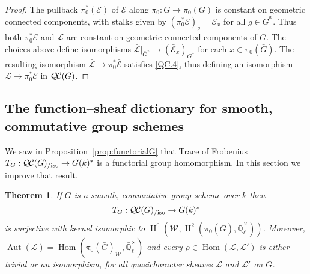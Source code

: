 \documentclass{amsart}
\theoremstyle{plain}
\newtheorem{theorem}{Theorem}[section]
\theoremstyle{definition}
\theoremstyle{remark}
\newcommand{\EE}{\mathbb{\bar Q}_\ell}
\newcommand{\Fq}{k}
\newcommand{\EEx}{\EE^\times}
\newcommand{\Weil}[1]{\mathcal{W}_{#1}}
\DeclareMathOperator{\Aut}{Aut}
\DeclareMathOperator{\Hom}{Hom}
\DeclareMathOperator{\Hh}{H}
\newcommand{\qcs}[1]{{\mathcal{#1}}}
\newcommand{\gqcs}[1]{{\mathcal{\bar #1}}}
\newcommand{\QC}{{\mathcal{Q\hskip-0.8pt C}}}
\newcommand{\QCiso}[1]{\QC(#1)_{/\text{iso}}}
\newcommand{\TrFrob}[1]{T_{#1}}
\newcommand{\bG}{\bar{G}}
\begin{document}
\begin{proof}
The pullback $\pi_0^*(\qcs{E})$ of $\qcs{E}$ along $\pi_0 : G \to \pi_0(G)$ is constant
on geometric connected components, with stalks given by
$(\pi_0^* \qcs{E})_g = \qcs{E}_{x}$ for all $g\in \bG^x$.  Thus both $\pi_0^*\qcs{E}$ and $\qcs{L}$
are constant on geometric connected components of $G$.
The choices above define isomorphisms
$\gqcs{L}\vert_{\bG^x} \to  (\gqcs{E}_{x})_{\bG^x}$ for each $x\in \pi_0(\bG)$.
The resulting isomorphism $\gqcs{L} \to \pi_0^* \gqcs{E}$ satisfies \ref{QC.4},
thus defining an isomorphism $\qcs{L} \to \pi_0^* \qcs{E}$ in $\QC(G)$.
\end{proof}

\subsection{The function--sheaf dictionary for smooth, commutative group schemes}
\label{sec:snake}

We saw in Proposition~\ref{prop:functorialG} that Trace of Frobenius
$\TrFrob{G} : \QCiso{G} \to G(\Fq)^*$ is a functorial group homomorphism.
In this section we improve that result.

\begin{theorem}\label{thm:snake}
  If $G$ is a smooth, commutative group scheme over $\Fq$ then
  \[
  \TrFrob{G} : \QCiso{G} \to G(\Fq)^*
  \]
is surjective with kernel isomorphic to $\Hh^0(\Weil{},\Hh^2(\pi_0({\bar G}),\EEx))$.
 Moreover, $\Aut(\qcs{L}) = \Hom(\pi_0(\bG)_{\Weil{}},\EEx)$ and every $\rho \in \Hom(\qcs{L},\qcs{L}')$ is either trivial or an isomorphism, for all quasicharacter sheaves $\qcs{L}$ and $\qcs{L}'$ on $G$. 
\end{theorem}
\end{document}
